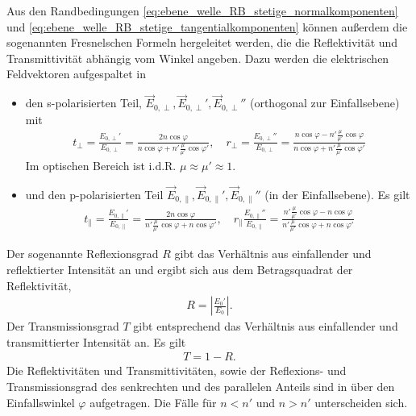 Aus den Randbedingungen \eqref{eq:ebene_welle_RB_stetige_normalkomponenten} und \eqref{eq:ebene_welle_RB_stetige_tangentialkomponenten} können außerdem die sogenannten Fresnelschen Formeln hergeleitet werden, die die Reflektivität und Transmittivität abhängig vom Winkel angeben.
Dazu werden die elektrischen Feldvektoren aufgespaltet in
\begin{itemize}
    \item den s-polarisierten Teil, $\vec E_{0,\perp},\vec E_{0,\perp}',\vec E_{0,\perp}''$ (orthogonal zur Einfallsebene) mit
          \begin{align}
              \label{eq:fresnel_senkrecht}
              t_\perp = \frac{E_{0,\perp}'}{E_{0,\perp}}=\frac{2n\cos\varphi}{n\cos\varphi+n'\frac{\mu}{\mu'}\cos\varphi'},\quad r_\perp = \frac{E_{0,\perp}''}{E_{0,\perp}}=\frac{n\cos\varphi-n'\frac{\mu}{\mu'}\cos\varphi}{n\cos\varphi+n'\frac{\mu}{\mu'}\cos\varphi'}
          \end{align}
          Im optischen Bereich ist i.d.R. $\mu\approx\mu'\approx 1$.
    \item und den p-polarisierten Teil $\vec E_{0,\parallel},\vec E_{0,\parallel}',\vec E_{0,\parallel}''$ (in der Einfallsebene). Es gilt
          \begin{align}
              \label{eq:fresnel_parallel}
              t_\parallel = \frac{E_{0,\parallel}'}{E_{0,\parallel}}=\frac{2n\cos\varphi}{n'\frac{\mu}{\mu'}\cos\varphi+n\cos\varphi'},\quad r_\parallel\frac{E_{0,\parallel}''}{E_{0,\parallel}}=\frac{n'\frac{\mu}{\mu'}\cos\varphi-n\cos\varphi}{n'\frac{\mu}{\mu'}\cos\varphi+n\cos\varphi'}
          \end{align}
\end{itemize}

Der sogenannte Reflexionsgrad $R$ gibt das Verhältnis aus einfallender und reflektierter Intensität an und ergibt sich aus dem Betragsquadrat der Reflektivität,
\begin{align*}
    R=\left| \frac{E_0'}{E_0} \right|.
\end{align*}
Der Transmissionsgrad $T$ gibt entsprechend das Verhältnis aus einfallender und transmittierter Intensität an. Es gilt
\begin{align*}
    T=1-R.
\end{align*}
Die Reflektivitäten und Transmittivitäten, sowie der Reflexions- und Transmissionsgrad des senkrechten und des parallelen Anteils sind in 
über den Einfallswinkel $\varphi$ aufgetragen. Die Fälle für $n<n'$ und $n>n'$ unterscheiden sich.

